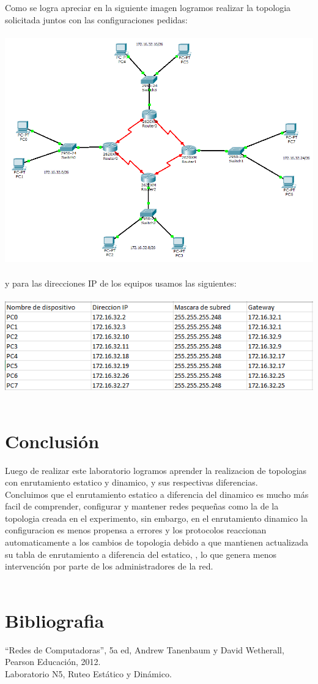 \documentclass{article}
\begin{document}
Como se logra apreciar en la siguiente imagen logramos realizar la topologia solicitada juntos con las configuraciones pedidas:\\\\

\includegraphics[scale=0.5]{topologia.png}\\\\

y para las direcciones IP de los equipos usamos las siguientes:\\\\

\includegraphics[scale=0.8]{ippc.png}\\\\

\section{Conclusión}
Luego de realizar este laboratorio logramos aprender la realizacion de topologias con enrutamiento estatico y dinamico, y sus respectivas diferencias.\\

Concluimos que el enrutamiento estatico a diferencia del dinamico es mucho más facil de comprender, configurar y mantener redes pequeñas como la de la topologia creada en el experimento, sin embargo, en el enrutamiento dinamico la configuracion es menos propensa a errores y los protocolos reaccionan automaticamente a los cambios de topologia debido a que mantienen actualizada su tabla de enrutamiento a diferencia del estatico, , lo que genera menos intervención por parte de los administradores de la red.\\\\


\section{Bibliografia}
“Redes de Computadoras”, 5a ed, Andrew Tanenbaum y David Wetherall, Pearson Educación, 2012.\\
Laboratorio N5, Ruteo Estático y Dinámico.\\
\end{document}
